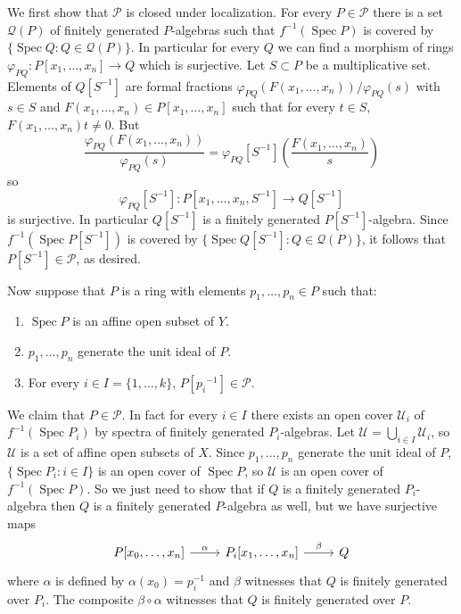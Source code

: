 \documentclass[10pt]{article}
\newcommand{\Spec}{\operatorname{Spec}}
\theoremstyle{definition}
\begin{document}
We first show that $\mathcal P$ is closed under localization.
For every $P \in \mathcal P$ there is a set $\mathcal Q(P)$ of finitely generated $P$-algebras such that $f^{-1}(\Spec P)$ is covered by $\{\Spec Q: Q \in \mathcal Q(P)\}$.
In particular for every $Q$ we can find a morphism of rings $\varphi_{PQ}: P[x_1, \dots, x_n] \to Q$ which is surjective.
Let $S \subset P$ be a multiplicative set.
Elements of $Q[S^{-1}]$ are formal fractions $\varphi_{PQ}(F(x_1, \dots, x_n))/\varphi_{PQ}(s)$ with $s \in S$ and $F(x_1, \dots, x_n) \in P[x_1, \dots, x_n]$ such that for every $t \in S$, $F(x_1, \dots, x_n)t \neq 0$.
But
$$\frac{\varphi_{PQ}(F(x_1, \dots, x_n))}{\varphi_{PQ}(s)} = \varphi_{PQ}[S^{-1}]\left(\frac{F(x_1, \dots, x_n)}{s}\right)$$
so
$$\varphi_{PQ}[S^{-1}]: P[x_1, \dots, x_n, S^{-1}] \to Q[S^{-1}]$$
is surjective.
In particular $Q[S^{-1}]$ is a finitely generated $P[S^{-1}]$-algebra.
Since $f^{-1}(\Spec P[S^{-1}])$ is covered by $\{\Spec Q[S^{-1}]: Q \in \mathcal Q(P)\}$, it follows that $P[S^{-1}] \in \mathcal P$, as desired.

Now suppose that $P$ is a ring with elements $p_1, \dots, p_n \in P$ such that:
\begin{enumerate}
\item $\Spec P$ is an affine open subset of $Y$.
\item $p_1, \dots, p_n$ generate the unit ideal of $P$.
\item For every $i \in I = \{1, \dots, k\}$, $P[{p_i}^{-1}] \in \mathcal P$.
\end{enumerate}
We claim that $P \in \mathcal P$.
In fact for every $i \in I$ there exists an open cover $\mathcal U_i$ of $f^{-1}(\Spec P_i)$ by spectra of finitely generated $P_i$-algebras.
Let $\mathcal U = \bigcup_{i \in I} \mathcal U_i$, so $\mathcal U$ is a set of affine open subsets of $X$.
Since $p_1, \dots, p_n$ generate the unit ideal of $P$, $\{\Spec P_i: i \in I\}$ is an open cover of $\Spec P$, so $\mathcal U$ is an open cover of $f^{-1}(\Spec P)$.
So we just need to show that if $Q$ is a finitely generated $P_i$-algebra then $Q$ is a finitely generated $P$-algebra as well, but we have surjective maps
$$\begin{tikzcd}
P[x_0, \dots, x_n] \arrow[r,"\alpha"] & P_i[x_1, \dots, x_n] \arrow[r,"\beta"] & Q
\end{tikzcd}
$$
where $\alpha$ is defined by $\alpha(x_0) = p_i^{-1}$ and $\beta$ witnesses that $Q$ is finitely generated over $P_i$.
The composite $\beta \circ \alpha$ witnesses that $Q$ is finitely generated over $P$.
\end{document}
